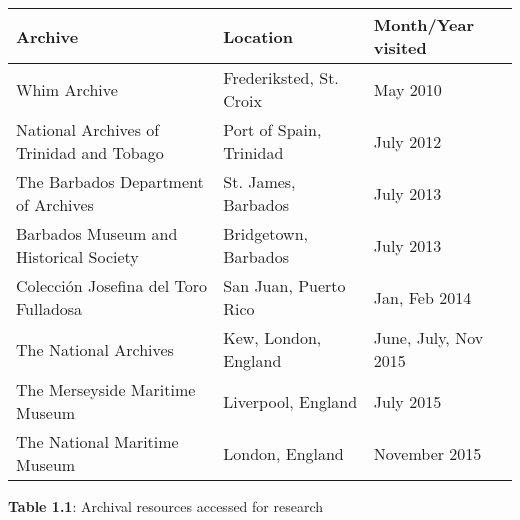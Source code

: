 \begin{flushleft}
\tablehead{}
\begin{supertabular}{m{2.6018598in}m{1.7198598in}m{1.4531599in}}
\hline
\textbf{Archive} &
\textbf{Location} &
\textbf{Month/Year visited}\\\hline
Whim Archive\ \  &
Frederiksted, St. Croix &
May 2010\\
National Archives of Trinidad and Tobago &
Port of Spain, Trinidad &
July 2012\\
The Barbados Department of Archives &
St. James, Barbados &
July 2013\\
Barbados Museum and Historical Society &
Bridgetown, Barbados &
July 2013\\
Colección Josefina del Toro Fulladosa &
San Juan, Puerto Rico &
Jan, Feb 2014\\
The National Archives\ \  &
Kew, London, England\ \  &
June, July, Nov 2015\\
The Merseyside Maritime Museum &
Liverpool, England &
July 2015\\
The National Maritime Museum &
London, England &
November 2015\\\hline
\end{supertabular}
\end{flushleft}
\begin{styleNormali}
\textbf{Table 1.1}: Archival resources accessed for research
\end{styleNormali}


